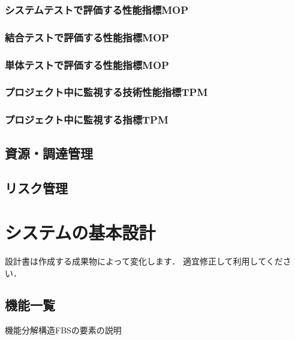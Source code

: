 \documentclass[lualatex,book,paper=a4paper,jafontsize=11.5pt,jafontscale=1.05]{jlreq}
\begin{document}
\subsection{システムテストで評価する性能指標MOP}

\subsection{結合テストで評価する性能指標MOP}

\subsection{単体テストで評価する性能指標MOP}

\subsection{プロジェクト中に監視する技術性能指標TPM}

\subsection{プロジェクト中に監視する指標TPM}


\section{資源・調達管理}


\section{リスク管理}


\chapter{システムの基本設計}

設計書は作成する成果物によって変化します．
適宜修正して利用してください．


\section{機能一覧}
機能分解構造FBSの要素の説明

\end{document}
